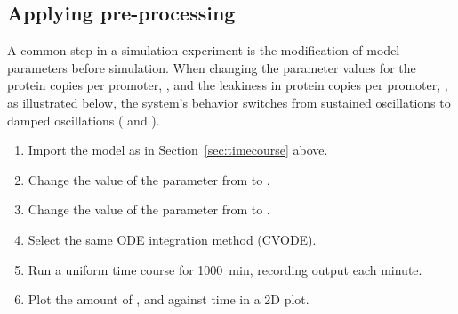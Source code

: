 \subsection{Applying pre-processing}
\label{sec:preprocessing}
A common step in a simulation experiment is the modification of model parameters before simulation. When changing the parameter values for the protein copies per promoter, , and the leakiness in protein copies per promoter, , as illustrated below, the system's behavior switches from sustained oscillations to damped oscillations ( and ).

\begin{enumerate}
	\item{Import the model as in Section~\ref{sec:timecourse} above.}
	\item{Change the value of the parameter  from  to .}
	\item{Change the value of the parameter  from  to .}
	\item{Select the same ODE integration method (CVODE).}
	\item{Run a uniform time course for 1000~min, recording output each minute.}
	\item Plot the amount of ,  and  against time in a 2D plot.
\end{enumerate}

